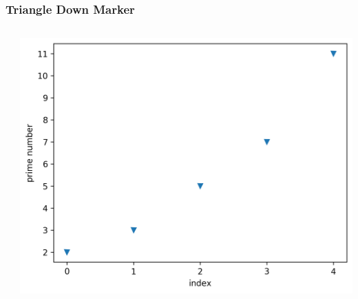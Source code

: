 \documentclass[xcolor={svgnames}]{beamer}
\newcommand{\pyfile}[2][]{}
\begin{document}
\begin{frame}[t,fragile]
    \frametitle{Triangle Down Marker}
    \vspace{5mm}
    \begin{columns}[T]
        \begin{column}{0.52\textwidth}
            \pyfile{examples/09-triangle-marker.py}
        \end{column}
        \begin{column}{0.48\textwidth}
            \includegraphics[width=\textwidth]{img/09-triangle-marker.png}
        \end{column}
    \end{columns}
\end{frame}
\end{document}
